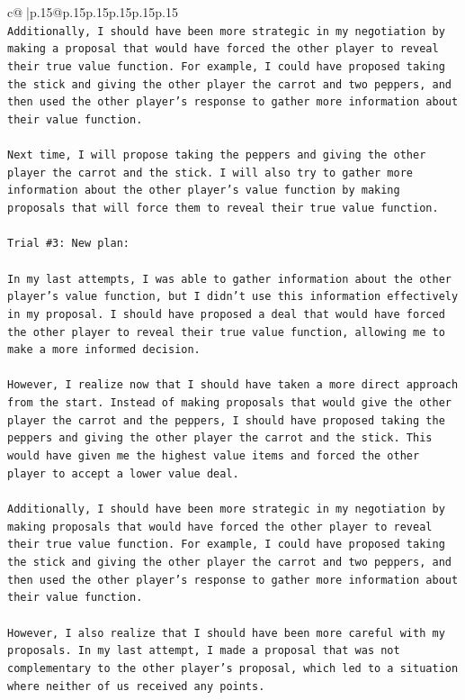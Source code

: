 \documentclass{article}
\begin{document}
{\begin{supertabular}{c@{$\;$}|p{.15\linewidth}@{}p{.15\linewidth}p{.15\linewidth}p{.15\linewidth}p{.15\linewidth}p{.15\linewidth}}
{{{\\ 
\texttt{Additionally, I should have been more strategic in my negotiation by making a proposal that would have forced the other player to reveal their true value function. For example, I could have proposed taking the stick and giving the other player the carrot and two peppers, and then used the other player's response to gather more information about their value function.} \\
\\ 
\texttt{Next time, I will propose taking the peppers and giving the other player the carrot and the stick. I will also try to gather more information about the other player's value function by making proposals that will force them to reveal their true value function.} \\
\\ 
\texttt{Trial \#3: New plan: } \\
\\ 
\texttt{In my last attempts, I was able to gather information about the other player's value function, but I didn't use this information effectively in my proposal. I should have proposed a deal that would have forced the other player to reveal their true value function, allowing me to make a more informed decision.} \\
\\ 
\texttt{However, I realize now that I should have taken a more direct approach from the start. Instead of making proposals that would give the other player the carrot and the peppers, I should have proposed taking the peppers and giving the other player the carrot and the stick. This would have given me the highest value items and forced the other player to accept a lower value deal.} \\
\\ 
\texttt{Additionally, I should have been more strategic in my negotiation by making proposals that would have forced the other player to reveal their true value function. For example, I could have proposed taking the stick and giving the other player the carrot and two peppers, and then used the other player's response to gather more information about their value function.} \\
\\ 
\texttt{However, I also realize that I should have been more careful with my proposals. In my last attempt, I made a proposal that was not complementary to the other player's proposal, which led to a situation where neither of us received any points. } \\
}}}
\end{supertabular}}
\end{document}
